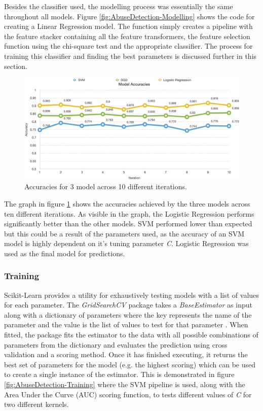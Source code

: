 Besides the classifier used, the modelling process was essentially the same throughout all models. Figure \ref{fig:AbuseDetection-Modelling} shows the code for creating a Linear Regression model. The function simply creates a pipeline with the feature stacker containing all the feature transformers, the feature selection function using the chi-square test and the appropriate classifier. The process for training this classifier and finding the best parameters is discussed further in this section.

\begin{figure}[H]
	\centering
	\includegraphics[width=\textwidth]{Images/Implementation/DataProcessing/AbuseDetection/ModelAccuracies}
	\caption{Accuracies for 3 model across 10 different iterations.}
	\label{fig:AbuseDetection-ModelAccuracies}
\end{figure}

The graph in figure \ref{fig:AbuseDetection-ModelAccuracies} shows the accuracies achieved by the three models across ten different iterations. As visible in the graph, the Logistic Regression performs significantly better than the other models. SVM performed lower than expected but this could be a result of the parameters used, as the accuracy of an SVM model is highly dependent on it's tuning parameter \textit{C}. Logistic Regression was used as the final model for predictions.

\subsubsection{Training}
Scikit-Learn provides a utility for exhaustively testing models with a list of values for each parameter. The \textit{GridSearchCV} package takes a \textit{BaseEstimator} as input along with a dictionary of parameters where the key represents the name of the parameter and the value is the list of values to test for that parameter \cite{Scikit:GridSearch}. When fitted, the package fits the estimator to the data with all possible combinations of parameters from the dictionary and evaluates the prediction using cross validation and a scoring method. Once it has finished executing, it returns the best set of parameters for the model (e.g. the highest scoring) which can be used to create a single instance of the estimator. This is demonstrated in figure \ref{fig:AbuseDetection-Training} where the SVM pipeline is used, along with the Area Under the Curve (AUC) scoring function, to tests different values of \textit{C} for two different kernels.

